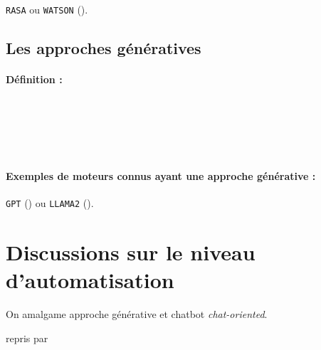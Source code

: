 				\texttt{RASA} \cite{bocklisch-etal:2017:rasa-open-source}
				ou \texttt{WATSON} (\cite{hoyt-etal:2016:ibm-watson-analytics}).
		
		
		\subsection{Les approches génératives}
		\label{annex:B.2.2-CHATBOT-ARCHITECTURES-GENERATIVE}
		
			\paragraph{Définition :}
			
				\cite{uszkoreit:2017:transformer-novel-neural}  \\ %
				\cite{ni-etal:2022:recent-advances-deep}  \\ %
				\cite{openai:2023:chatgpt}  \\ %
				\cite{touvron-etal:2023:llama-open-foundation}  \\ %
				\cite{kaddour-etal:2023:challenges-applications-large} %
			
			\paragraph{Exemples de moteurs connus ayant une approche générative :}
				\texttt{GPT} (\cite{openai:2023:chatgpt})
				ou \texttt{LLAMA2} (\cite{touvron-etal:2023:llama-open-foundation}).
	
	
	\section{Discussions sur le niveau d'automatisation}
	\label{annex:B.2-CHATBOT-DISCUSSION-AUTOMATISATION}
		
			
		\begin{leftBarAuthorOpinion}
			On amalgame approche générative et chatbot \textit{chat-oriented}.
		\end{leftBarAuthorOpinion}
		
		\cite{sheridan-verplank:1978:human-computer-control} repris par \cite{parasuraman-etal:2000:model-types-levels} \\ %

